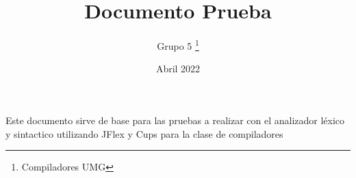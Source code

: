 \documentclass[12pt, letterpaper]{article}
\title{Documento Prueba}
\author{Grupo 5 \thanks{Compiladores UMG}}
\date{Abril 2022}
\begin{document}
\begin{titlepage}
\maketitle
\end{titlepage}

Este documento sirve de base para las pruebas a realizar
 con el analizador léxico y sintactico utilizando JFlex y Cups para la clase de compiladores
\end{document}

